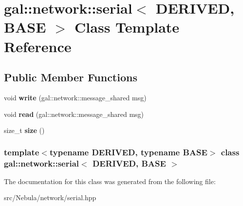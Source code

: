 \hypertarget{classgal_1_1network_1_1serial}{\section{gal\-:\-:network\-:\-:serial$<$ \-D\-E\-R\-I\-V\-E\-D, \-B\-A\-S\-E $>$ \-Class \-Template \-Reference}
\label{classgal_1_1network_1_1serial}
}
\subsection*{\-Public \-Member \-Functions}
\begin{DoxyCompactItemize}
\item 
\hypertarget{classgal_1_1network_1_1serial_ab4049343e023fb2e57e8bc4fee306300}{void {\bfseries write} (gal\-::network\-::message\-\_\-shared msg)}\label{classgal_1_1network_1_1serial_ab4049343e023fb2e57e8bc4fee306300}

\item 
\hypertarget{classgal_1_1network_1_1serial_a9b2c7927aff4750ab8be49f7849aa736}{void {\bfseries read} (gal\-::network\-::message\-\_\-shared msg)}\label{classgal_1_1network_1_1serial_a9b2c7927aff4750ab8be49f7849aa736}

\item 
\hypertarget{classgal_1_1network_1_1serial_a933ac0cf62f984b824549498c99c4cc1}{size\-\_\-t {\bfseries size} ()}\label{classgal_1_1network_1_1serial_a933ac0cf62f984b824549498c99c4cc1}

\end{DoxyCompactItemize}
\subsubsection*{template$<$typename \-D\-E\-R\-I\-V\-E\-D, typename \-B\-A\-S\-E$>$ class gal\-::network\-::serial$<$ D\-E\-R\-I\-V\-E\-D, B\-A\-S\-E $>$}



\-The documentation for this class was generated from the following file\-:\begin{DoxyCompactItemize}
\item 
src/\-Nebula/network/serial.\-hpp\end{DoxyCompactItemize}
